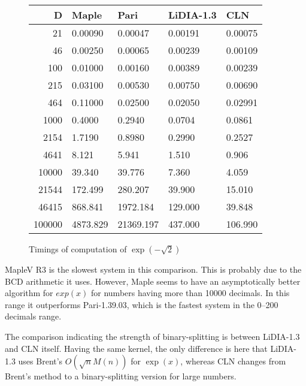 \begin{figure}[htb]
\begin{center}
\begin{tabular}{|r|l|l|l|l|}
\hline
D           &  Maple & Pari & {\sf LiDIA-1.3} & CLN \\
\hline
\hline
21          & 0.00090   & 0.00047 & 0.00191           & 0.00075 \\
\hline
46          & 0.00250   & 0.00065 & 0.00239           & 0.00109 \\
\hline
100         & 0.01000   & 0.00160 & 0.00389           & 0.00239 \\
\hline
215         & 0.03100   & 0.00530 & 0.00750           & 0.00690 \\
\hline
464         & 0.11000   & 0.02500 & 0.02050           & 0.02991 \\
\hline
1000        & 0.4000    & 0.2940  & 0.0704            & 0.0861 \\
\hline
2154        & 1.7190    & 0.8980  & 0.2990            & 0.2527 \\
\hline
4641        & 8.121     & 5.941   & 1.510             & 0.906 \\
\hline
10000       & 39.340    & 39.776  & 7.360             & 4.059 \\
\hline
21544       & 172.499   & 280.207 & 39.900            & 15.010 \\
\hline
46415       & 868.841   & 1972.184& 129.000           & 39.848 \\
\hline
100000      & 4873.829  & 21369.197& 437.000           & 106.990 \\
\hline
\end{tabular}
\caption{Timings of computation of \( \exp(-\sqrt{2}) \)}\label{Fig2}
\end{center}
\end{figure}

MapleV R3 is the slowest system in this comparison. This is probably due to
the BCD arithmetic it uses. However, Maple seems to have an asymptotically
better algorithm for \( exp (x) \) for numbers having more than 10000 decimals.
In this range it outperforms Pari-1.39.03, which is the fastest system in the
0--200 decimals range.

The comparison indicating the strength of binary-splitting is between
{\sf LiDIA-1.3} and CLN itself. Having the same kernel, the only
difference is here that {\sf LiDIA-1.3} uses Brent's \( O(\sqrt{n}M(n)) \)
for \( \exp(x) \), whereas CLN changes from Brent's method to a
binary-splitting version for large numbers.

